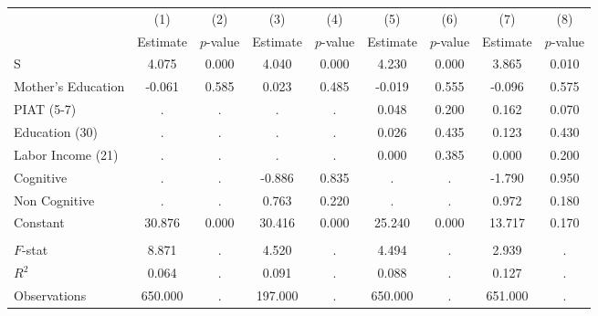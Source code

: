 \begin{tabular}{lcccccccc} \toprule
 & (1) & (2) & (3) & (4) & (5) & (6) & (7) & (8) \\ 
 & Estimate  & $p$-value  & Estimate  & $p$-value  & Estimate  & $p$-value  & Estimate  & $p$-value  \\  \midrule
S &     4.075 &     0.000 &     4.040 &     0.000 &     4.230 &     0.000 &     3.865 &     0.010 \\  
Mother's Education &    -0.061 &     0.585 &     0.023 &     0.485 &    -0.019 &     0.555 &    -0.096 &     0.575 \\  
PIAT (5-7) &         . &         . &         . &         . &     0.048 &     0.200 &     0.162 &     0.070 \\  
Education (30) &         . &         . &         . &         . &     0.026 &     0.435 &     0.123 &     0.430 \\  
Labor Income (21) &         . &         . &         . &         . &     0.000 &     0.385 &     0.000 &     0.200 \\  
Cognitive &         . &         . &    -0.886 &     0.835 &         . &         . &    -1.790 &     0.950 \\  
Non Cognitive &         . &         . &     0.763 &     0.220 &         . &         . &     0.972 &     0.180 \\  
Constant &    30.876 &     0.000 &    30.416 &     0.000 &    25.240 &     0.000 &    13.717 &     0.170 \\  \\ \midrule
$F$-stat &     8.871 &         . &     4.520 &         . &     4.494 &         . &     2.939 &         . \\  
$R^2$ &     0.064 &         . &     0.091 &         . &     0.088 &         . &     0.127 &         . \\  
Observations &   650.000 &         . &   197.000 &         . &   650.000 &         . &   651.000 &         . \\  
\midrule \end{tabular}
